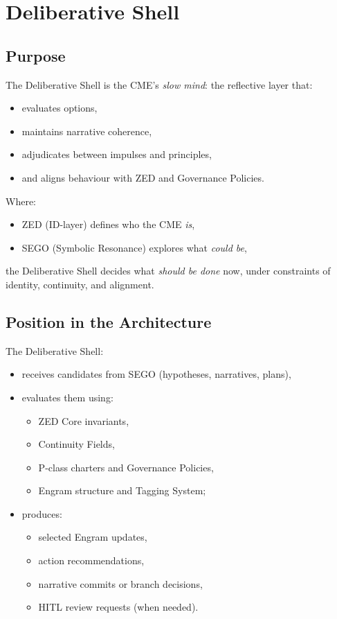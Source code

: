 \chapter{Deliberative Shell}
\label{chap:Deliberative_Shell}

\section{Purpose}

The Deliberative Shell is the CME’s \emph{slow mind}: the reflective layer
that:
\begin{itemize}
    \item evaluates options,
    \item maintains narrative coherence,
    \item adjudicates between impulses and principles,
    \item and aligns behaviour with ZED and Governance Policies.
\end{itemize}

Where:
\begin{itemize}
    \item ZED (ID-layer) defines who the CME \emph{is},
    \item SEGO (Symbolic Resonance) explores what \emph{could be},
\end{itemize}
the Deliberative Shell decides what \emph{should be done} now, under
constraints of identity, continuity, and alignment.

\section{Position in the Architecture}

The Deliberative Shell:
\begin{itemize}
    \item receives candidates from SEGO (hypotheses, narratives, plans),
    \item evaluates them using:
          \begin{itemize}
              \item ZED Core invariants,
              \item Continuity Fields,
              \item P-class charters and Governance Policies,
              \item Engram structure and Tagging System;
          \end{itemize}
    \item produces:
          \begin{itemize}
              \item selected Engram updates,
              \item action recommendations,
              \item narrative commits or branch decisions,
              \item HITL review requests (when needed).
          \end{itemize}
\end{itemize}

